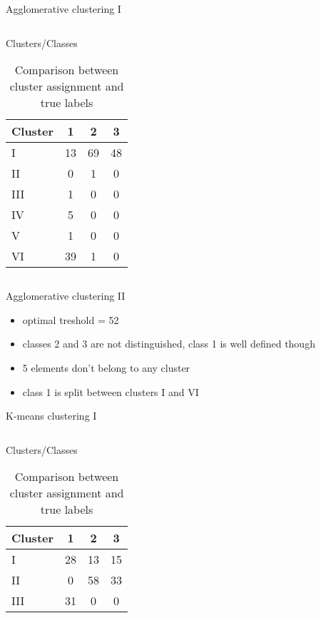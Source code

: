 \documentclass{beamer}
\begin{document}
\begin{frame}{Agglomerative clustering I}
\begin{columns}[t]
\begin{column}{.4\textwidth}
\begin{table}{Clusters/Classes}
\begin{tabular}{l || c | c | c  }
Cluster & 1 & 2 & 3 \\
\hline \hline
I & 13 & 69 & 48 \\ 
II & 0 & 1 & 0 \\
III & 1 & 0 & 0 \\
IV & 5 & 0 & 0 \\
V & 1 & 0 & 0 \\
VI & 39 & 1 & 0
\end{tabular}
\caption{{\scriptsize Comparison between cluster assignment and true labels}}
\end{table}
\end{column}
\begin{column}{.6\textwidth}
\end{column}
\end{columns}
\end{frame}

\begin{frame}{Agglomerative clustering II}
	\begin{itemize}
		\item{
		optimal treshold = 52
		}
		\item{
		classes 2 and 3 are not distinguished, class 1 is well defined though
		}
		\item{
		5 elements don't belong to any cluster
		}
		\item{
		class 1 is split between clusters I and VI
		}
	\end{itemize}
\end{frame}


\begin{frame}{K-means clustering I}
\begin{columns}[t]
\begin{column}{.4\textwidth}
\begin{table}{Clusters/Classes}
\begin{tabular}{l || c | c | c  }
Cluster & 1 & 2 & 3 \\
\hline \hline
I & 28 & 13 & 15 \\ 
II & 0 & 58 & 33 \\
III & 31 & 0& 0 
\end{tabular}
\caption{{\scriptsize Comparison between cluster assignment and true labels}}
\end{table}
\end{column}
\begin{column}{.6\textwidth}
\end{column}
\end{columns}
\end{frame}
\end{document}
